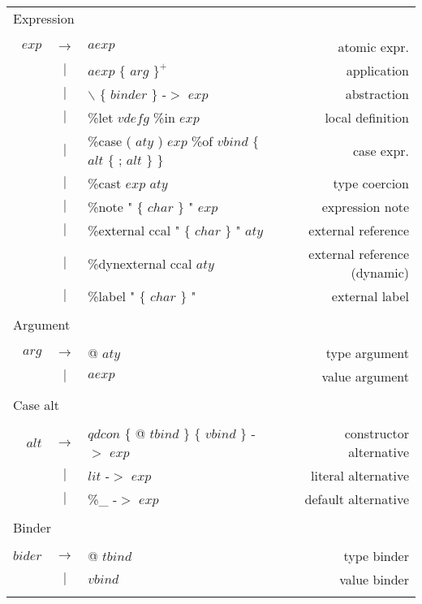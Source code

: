 \begin{footnotesize}
\begin{longtable}{ r c l r }
\multicolumn{4}{l}{Expression}			 \\
\\[0.01in]
$exp$		& $ \rightarrow $	& $aexp$										& atomic expr.		\\
		& $ | $			& $aexp$ $\{$ $arg$ $\}^{+}$ 								& application		\\
		& $ | $			& $\backslash$ $\{$ $binder$ $\}$ -$>$ $exp$						& abstraction		\\
		& $ | $			& \%let	$vdefg$ \%in $exp$								& local definition	\\
		& $ | $			& \%case ( $aty$ ) $exp$ \%of $vbind$ $\{$ $alt$ $\{$ ; $alt$ $\}$ $\}$			& case expr.		\\
		& $ | $			& \%cast $exp$ $aty$									& type coercion		\\
		& $ | $			& \%note "  $\{$ $char$ $\}$ " $exp$							& expression note	\\
		& $ | $			& \%external ccal " $\{$ $char$ $\}$ " $aty$						& external reference	\\
		& $ | $			& \%dynexternal ccal $aty$								& external reference (dynamic)	\\
		& $ | $			& \%label " $\{$ $char$ $\}$ "								& external label	\\
\\[0.01in]

\multicolumn{4}{l}{Argument}			 \\
\\[0.01in]
$arg$		& $ \rightarrow $	& @ $aty$										& type argument		\\
		& $ | $			& $aexp$										& value argument	\\
\\[0.01in]

\multicolumn{4}{l}{Case alt}			 \\
\\[0.01in]
$alt$		& $ \rightarrow $	& $qdcon$ $\{$ @ $tbind$ $\}$ $\{$ $vbind$ $\}$ -$>$ $exp$				& constructor alternative \\
		& $ | $			& $lit$ -$>$ $exp$									& literal alternative 	\\
		& $ | $			& \%\_ -$>$ $exp$									& default alternative	\\
\\[0.01in]

\multicolumn{4}{l}{Binder}			 \\
\\[0.01in]
$bider$		& $ \rightarrow $	& @ $tbind$										& type binder		\\
		& $ | $			& $vbind$										& value binder		\\
\\[0.01in]


\end{longtable}
\end{footnotesize}
